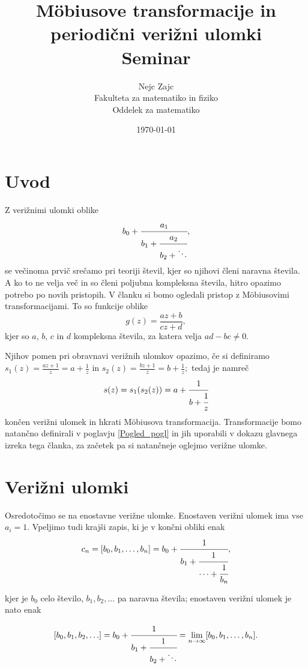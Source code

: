 \documentclass[a4paper,12pt]{article}
\title{M\"obiusove transformacije in periodični verižni ulomki \\ 
\Large Seminar}
\author{Nejc Zajc \\
Fakulteta za matematiko in fiziko \\
Oddelek za matematiko}
\date{\today}
\begin{document}


\maketitle



\section{Uvod}

Z verižnimi ulomki oblike
\[
    b_0 + \cfrac{a_1}{b_1 + \cfrac{a_2}{b_2 + \ddots}},
\]
se večinoma prvič srečamo pri teoriji števil, kjer so njihovi členi naravna števila. A ko to ne velja več in so členi poljubna kompleksna števila, hitro opazimo potrebo po novih pristopih. V članku si bomo ogledali pristop z M\"obiusovimi transformacijami. To so funkcije oblike 
\begin{equation}
\label{Mob_def}
    g(z) = \frac{az + b}{cz + d},
\end{equation}
kjer so $a$, $b$, $c$ in $d$ kompleksna števila, za katera velja $ad - bc \neq 0.$

Njihov pomen pri obravnavi verižnih ulomkov opazimo, če si definiramo $s_1(z) = \frac{az + 1}{z} = a + \frac{1}{z}$ in $s_2(z) = \frac{bz + 1}{z} = b + \frac{1}{z};$ tedaj je namreč
\[
    s(z) = s_1(s_2(z)) = a + \cfrac{1}{b + \cfrac{1}{z}}  
\]
končen verižni ulomek in hkrati M\"obiusova transformacija. Transformacije bomo natančno definirali v poglavju \ref{Pogled_pogl} in jih uporabili v dokazu glavnega izreka tega članka, za začetek pa si natančneje oglejmo verižne ulomke.


\section{Verižni ulomki}

Osredotočimo se na enostavne verižne ulomke. Enostaven verižni ulomek ima vse $a_i = 1$. Vpeljimo tudi krajši zapis, ki je v končni obliki enak
\[
    c_n = [b_0, b_1, \ldots, b_n] = b_0 + \cfrac{1}{b_1 + \cfrac{1}{\cdots + \cfrac{1}{b_n}}},
\]

kjer je $b_0$ celo število, $b_1, b_2, \ldots$ pa naravna števila; enostaven verižni ulomek je nato enak

\begin{equation}
\label{Ver_def}
    [b_0, b_1, b_2, \ldots] = b_0 + \cfrac{1}{b_1 + \cfrac{1}{b_2 + \ddots}} = \lim_{n \to \infty} [b_0, b_1, \ldots, b_n].
\end{equation}
\end{document}
